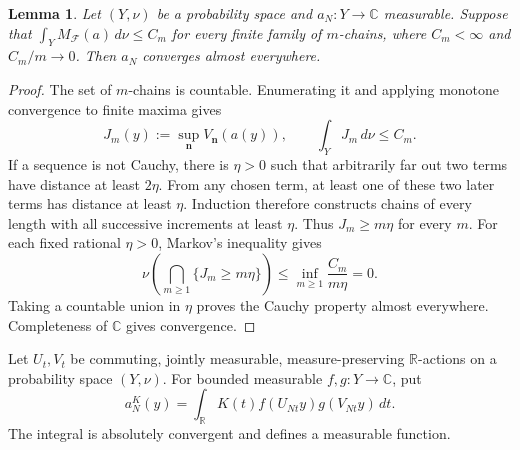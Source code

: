 \documentclass[11pt,a4paper]{article}
\newtheorem{lemma}[theorem]{Lemma}
\theoremstyle{definition}
\newenvironment{statementframe}
  {\par\addvspace{4pt}\noindent
   \setlength{\fboxsep}{6pt}\setlength{\fboxrule}{0.45pt}%
   \begin{lrbox}{\statementbox}%
   \begin{minipage}{\dimexpr\linewidth-2\fboxsep-2\fboxrule\relax}}
  {\end{minipage}\end{lrbox}%
   \fbox{\usebox{\statementbox}}\par\addvspace{4pt}}
\newcommand{\R}{\mathbb R}
\newcommand{\C}{\mathbb C}
\newcommand{\1}{\mathbf1}
\newcommand{\F}{\mathcal F}
\begin{document}
\begin{statementframe}
\begin{lemma}\label{lem:jump}
Let $(Y,\nu)$ be a probability space and $a_N:Y\to\C$ measurable. Suppose
that $\int_Y M_{\F}(a)\,d\nu\le C_m$ for every finite family of
$m$-chains, where $C_m<\infty$ and $C_m/m\to0$. Then $a_N$ converges
almost everywhere.
\end{lemma}
\end{statementframe}
\begin{proof}
The set of $m$-chains is countable. Enumerating it and applying monotone
convergence to finite maxima gives
\[
 J_m(y):=\sup_{\boldsymbol n}V_{\boldsymbol n}(a(y)),\qquad
 \int_Y J_m\,d\nu\le C_m.
\]
If a sequence is not Cauchy, there is $\eta>0$ such that arbitrarily far
out two terms have distance at least $2\eta$. From any chosen term, at
least one of these two later terms has distance at least $\eta$.
Induction therefore constructs chains of every length with all successive
increments at least $\eta$. Thus $J_m\ge m\eta$ for every $m$.
For each fixed rational $\eta>0$, Markov's inequality gives
\[
 \nu\left(\bigcap_{m\ge1}\{J_m\ge m\eta\}\right)
 \le \inf_{m\ge1}\frac{C_m}{m\eta}=0.
\]
Taking a countable union in $\eta$ proves the Cauchy property almost
everywhere. Completeness of $\C$ gives convergence.
\end{proof}

Let $U_t,V_t$ be commuting, jointly measurable, measure-preserving
$\R$-actions on a probability space $(Y,\nu)$. For bounded measurable
$f,g:Y\to\C$, put
\begin{equation}\label{eq:flowaverage}
 a_N^K(y)=\int_\R K(t)f(U_{Nt}y)g(V_{Nt}y)\,dt.
\end{equation}
The integral is absolutely convergent and defines a measurable function.
\end{document}
